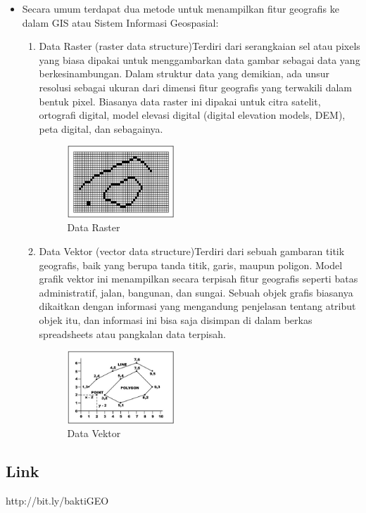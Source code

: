 \begin{itemize}
\item Secara umum terdapat dua metode untuk menampilkan fitur geografis ke dalam GIS atau Sistem Informasi Geospasial:
	\begin{enumerate}
	\item Data Raster  (raster data structure)Terdiri dari serangkaian sel atau pixels yang biasa dipakai untuk menggambarkan data gambar sebagai data yang berkesinambungan. Dalam struktur data yang demikian, ada unsur resolusi sebagai ukuran dari dimensi fitur geografis yang terwakili dalam bentuk pixel. Biasanya data raster ini dipakai untuk citra satelit, ortografi digital, model elevasi digital (digital elevation models, DEM), peta digital, dan sebagainya.
	\begin{figure}[H]
	\includegraphics[width=4cm]{figures/Tugas1/1174083/Raster.jpg}
	\centering
	\caption{Data Raster}
	\end{figure}
	\item Data Vektor (vector data structure)Terdiri dari sebuah gambaran titik geografis, baik yang berupa tanda titik, garis, maupun poligon. Model grafik vektor ini menampilkan secara terpisah fitur geografis seperti batas administratif, jalan, bangunan, dan sungai. Sebuah objek grafis biasanya dikaitkan dengan informasi yang mengandung penjelasan tentang atribut objek itu, dan informasi ini bisa saja disimpan di dalam berkas spreadsheets atau pangkalan data terpisah.
	\begin{figure}[H]
	\includegraphics[width=4cm]{figures/Tugas1/1174083/vektor.jpg}
	\centering
	\caption{Data Vektor}
	\end{figure}
	\end{enumerate}
\end{itemize}

\subsection{Link}
http://bit.ly/baktiGEO
